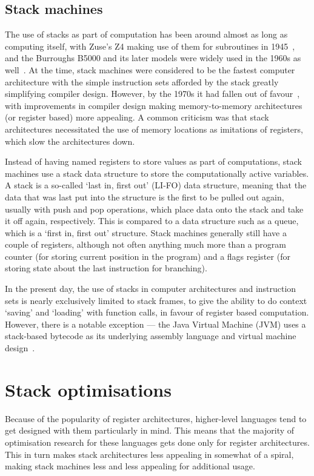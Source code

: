 \subsection{Stack machines}
The use of stacks as part of computation has been around almost as long as
computing itself, with Zuse's Z4 making use of them for subroutines in
1945~\cite{Speiser2000KZZ}, and the Burroughs B5000 and its later models were
widely used in the 1960s as well~\cite{Organick2014Computer}. At the time, stack
machines were considered to be the fastest computer architecture with the simple
instruction sets afforded by the stack greatly simplifying compiler design.
However, by the 1970s it had fallen out of favour~\cite{Myers1977CAS}, with
improvements in compiler design making memory-to-memory architectures (or
register based) more appealing. A common criticism was that stack architectures
necessitated the use of memory locations as imitations of registers, which slow
the architectures down.

Instead of having named registers to store values as part of computations, stack
machines use a stack data structure to store the computationally active
variables. A stack is a so-called `last in, first out' (LI-FO) data structure,
meaning that the data that was last put into the structure is the first to be
pulled out again, usually with push and pop operations, which place data onto
the stack and take it off again, respectively. This is compared to a data
structure such as a queue, which is a `first in, first out' structure. Stack
machines generally still have a couple of registers, although not often anything
much more than a program counter (for storing current position in the program)
and a flags register (for storing state about the last instruction for
branching).

In the present day, the use of stacks in computer architectures and instruction
sets is nearly exclusively limited to stack frames, to give the ability to do
context `saving' and `loading' with function calls, in favour of register based
computation. However, there is a notable exception --- the Java Virtual Machine
(JVM) uses a stack-based bytecode as its underlying assembly language and
virtual machine design~\cite{Schoeberl2005Design}.

\section{Stack optimisations}

Because of the popularity of register architectures, higher-level languages tend
to get designed with them particularly in mind. This means that the majority of
optimisation research for these languages gets done only for register
architectures. This in turn makes stack architectures less appealing in somewhat
of a spiral, making stack machines less and less appealing for additional usage.

